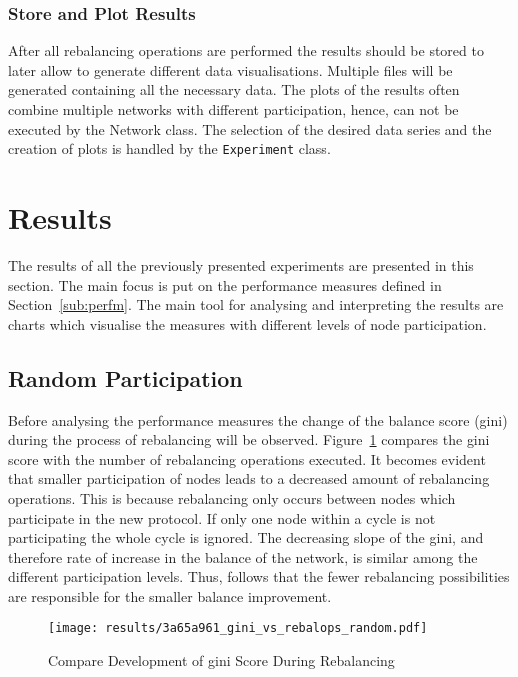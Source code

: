 \documentclass[final]{fhnwreport}       %
\begin{document}
\subsubsection{Store and Plot Results}
After all rebalancing operations are performed the results should be stored to later allow to generate different data visualisations. Multiple files will be generated containing all the necessary data. The plots of the results often combine multiple networks with different participation, hence, can not be executed by the Network class. The selection of the desired data series and the creation of plots is handled by the \texttt{Experiment} class.

\section{Results}\label{sec:result}
The results of all the previously presented experiments are presented in this section. The main focus is put on the performance measures defined in Section~\ref{sub:perfm}. The main tool for analysing and interpreting the results are charts which visualise the measures with different levels of node participation.

\subsection{Random Participation}
Before analysing the performance measures the change of the balance score (\gls{gini}) during the process of rebalancing will be observed. Figure~\ref{fig:gini_rebal_rand} compares the \gls{gini} score with the number of rebalancing operations executed. It becomes evident that smaller participation of nodes leads to a decreased amount of rebalancing operations. This is because rebalancing only occurs between nodes which participate in the new protocol. If only one node within a cycle is not participating the whole cycle is ignored. The decreasing slope of the \gls{gini}, and therefore rate of increase in the balance of the network, is similar among the different participation levels. Thus, follows that the fewer rebalancing possibilities are responsible for the smaller balance improvement. 

\begin{figure}[H]
\centering
\texttt{[image: results/3a65a961\_gini\_vs\_rebalops\_random.pdf]}
\caption{Compare Development of \gls{gini} Score During Rebalancing}
\label{fig:gini_rebal_rand}
\end{figure}
\end{document}
